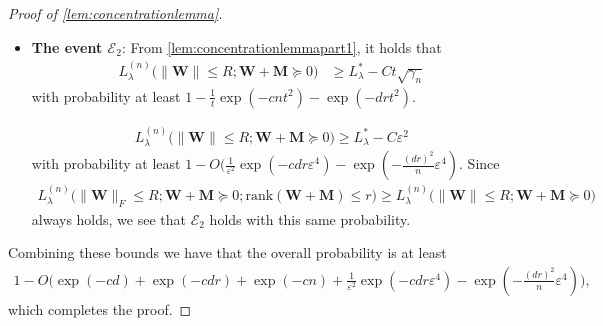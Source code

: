 \documentclass[10pt]{article}
\newcommand{\eps}{\ensuremath{\varepsilon}}
\newcommand{\s}{^*}
\theoremstyle{definition}
\begin{document}
\begin{proof}[Proof of \cref{lem:concentrationlemma}]
\begin{itemize}
with probability at least $$1 - O\bigg( \exp\big( - C dr \big( C \exp(- c dr) + s \big)^2 \big) + \exp( - c dr) \bigg)$$ Let $\eps^2 = s + C \exp(- c dr)$.  Then we have that
\begin{align}
     L_{\lambda}^{(n)}\big( \bm{Z}_{{\sf ST}}^{(\lambda/\zeta\s)}(\tau\s) - \bm{M} \big) \leq L_{\lambda}\s + \eps^2
\end{align}
with probability at least $1 - O( \exp( - c dr \eps^2 ) + \exp(- c dr))$ as long as $\eps^2 \geq C \exp(- c dr)$, as in the statement of the proof.
    \item \textbf{The event $\mathcal{E}_2$}: From \cref{lem:concentrationlemmapart1}, it holds that 
    \begin{align}
            L_{\lambda}^{(n)} \bigg( \|\bm{W}\|\leq R; \bm{W + M} \succcurlyeq 0 \bigg) &\geq L_{\lambda}\s - C t \sqrt{\gamma_n} 
    \end{align}
    with probability at least $1 - \frac{1}{t} \exp( - c n t^2) - \exp( - d r t^2)$.

    
    \begin{align}
        L_{\lambda}^{(n)} \bigg( \|\bm{W}\|\leq R; \bm{W + M} \succcurlyeq 0 \bigg) \geq L_{\lambda}\s - C \eps^2
    \end{align}
    with probability at least $1 -  O\big( \frac{1}{\eps^2} \exp(-c dr \eps^4 ) - \exp( - \frac{(dr)^2}{n} \eps^4)$.  Since 
    \begin{align}
        L_{\lambda}^{(n)} \bigg( \|\bm{W}\|_F \leq R; \bm{W} + \bm{M} \succcurlyeq 0; \mathrm{rank}(\bm{W} + \bm{M}) \leq r \bigg) \geq  L_{\lambda}^{(n)} \bigg( \|\bm{W}\|\leq R; \bm{W + M} \succcurlyeq 0 \bigg)
    \end{align}
    always holds, we see that $\mathcal{E}_2$ holds with this same probability.
\end{itemize}
Combining these bounds we have that the overall probability is at least
\begin{align}
    1 - O\bigg( \exp( - c d) +  \exp( - c dr) + \exp( - c n) + \frac{1}{\eps^2} \exp(-c dr \eps^4 ) - \exp( - \frac{(dr)^2}{n} \eps^4) \bigg),
\end{align}
which completes the proof. 
\end{proof}
\end{document}
